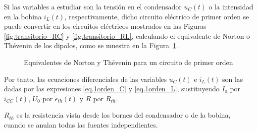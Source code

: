 \documentclass[11pt]{book} %
\begin{document}
	Si las variables a estudiar son la tensión en el condensador $u_C(t)$ o la intensidad en la bobina $i_L(t)$, respectivamente, dicho circuito eléctrico de primer orden se puede convertir en los circuitos eléctricos mostrados en las Figuras \ref{fig.transitorio_RC} y \ref{fig.transitorio_RL}, calculando el equivalente de Norton o Thévenin de los dipolos, como se muestra en la Figura~\ref{fig.thevenin_1orden}. 
	\begin{figure}[htbp]
	    \centering
	    \hfil
	    \caption{Equivalentes de Norton y Thévenin para un circuito de primer orden}
	    \label{fig.thevenin_1orden}
	\end{figure}
	Por tanto, las ecuaciones diferenciales de las variables $u_C(t)$ e $i_L(t)$ son las dadas por las expresiones \eqref{eq.1orden_C} y \eqref{eq.1orden_L}, sustituyendo $I_0$ por $i_{CC}(t)$, $U_0$ por $\epsilon_{th}(t)$ y $R$ por $R_{th}$.
	
	\begin{remark}
	    $R_{th}$ es la resistencia vista desde los bornes del condensador o de la bobina, cuando se anulan todas las fuentes independientes.
	\end{remark}
	
\end{document}

